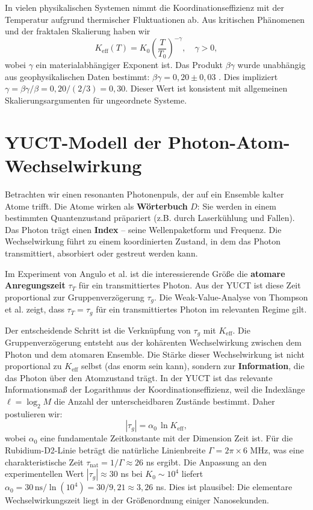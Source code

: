 \documentclass[12pt,a4paper]{article}
\newcommand{\Keff}{K_{\mathrm{eff}}}
\newcommand{\betagamma}{\beta\gamma}
\newcommand{\betac}{\beta}
\begin{document}
	In vielen physikalischen Systemen nimmt die Koordinationseffizienz mit der Temperatur aufgrund thermischer Fluktuationen ab. Aus kritischen Phänomenen und der fraktalen Skalierung haben wir
	\begin{equation}
		\Keff(T) = K_0 \left(\frac{T}{T_0}\right)^{-\gamma}, \quad \gamma > 0,
		\label{eq:K_T}
	\end{equation}
	wobei \(\gamma\) ein materialabhängiger Exponent ist. Das Produkt \(\betac\gamma\) wurde unabhängig aus geophysikalischen Daten bestimmt: \(\betagamma = 0,20 \pm 0,03\) \cite{Yakushev2026b}. Dies impliziert \(\gamma = \betagamma / \betac = 0,20 / (2/3) = 0,30\). Dieser Wert ist konsistent mit allgemeinen Skalierungsargumenten für ungeordnete Systeme.
	
	\section{YUCT-Modell der Photon-Atom-Wechselwirkung}
	
	Betrachten wir einen resonanten Photonenpuls, der auf ein Ensemble kalter Atome trifft. Die Atome wirken als \textbf{Wörterbuch} \(D\): Sie werden in einem bestimmten Quantenzustand präpariert (z.B. durch Laserkühlung und Fallen). Das Photon trägt einen \textbf{Index} – seine Wellenpaketform und Frequenz. Die Wechselwirkung führt zu einem koordinierten Zustand, in dem das Photon transmittiert, absorbiert oder gestreut werden kann.
	
	Im Experiment von Angulo et al. \cite{Angulo2024} ist die interessierende Größe die \textbf{atomare Anregungszeit} \(\tau_T\) für ein transmittiertes Photon. Aus der YUCT ist diese Zeit proportional zur Gruppenverzögerung \(\tau_g\). Die Weak-Value-Analyse von Thompson et al. \cite{Thompson2023} zeigt, dass \(\tau_T = \tau_g\) für ein transmittiertes Photon im relevanten Regime gilt.
	
	Der entscheidende Schritt ist die Verknüpfung von \(\tau_g\) mit \(\Keff\). Die Gruppenverzögerung entsteht aus der kohärenten Wechselwirkung zwischen dem Photon und dem atomaren Ensemble. Die Stärke dieser Wechselwirkung ist nicht proportional zu \(\Keff\) selbst (das enorm sein kann), sondern zur \textbf{Information}, die das Photon über den Atomzustand trägt. In der YUCT ist das relevante Informationsmaß der Logarithmus der Koordinationseffizienz, weil die Indexlänge \(\ell = \log_2 M\) die Anzahl der unterscheidbaren Zustände bestimmt. Daher postulieren wir:
	\begin{equation}
		|\tau_g| = \alpha_0 \, \ln\Keff,
		\label{eq:tau_log}
	\end{equation}
	wobei \(\alpha_0\) eine fundamentale Zeitkonstante mit der Dimension Zeit ist. Für die Rubidium-D2-Linie beträgt die natürliche Linienbreite \(\Gamma = 2\pi \times 6\) MHz, was eine charakteristische Zeit \(\tau_{\text{nat}} = 1/\Gamma \approx 26\) ns ergibt. Die Anpassung an den experimentellen Wert \(|\tau_g| \approx 30\) ns bei \(K_0 \sim 10^4\) liefert \(\alpha_0 = 30\,\text{ns} / \ln(10^4) = 30 / 9,21 \approx 3,26\) ns. Dies ist plausibel: Die elementare Wechselwirkungszeit liegt in der Größenordnung einiger Nanosekunden.
	
\end{document}
